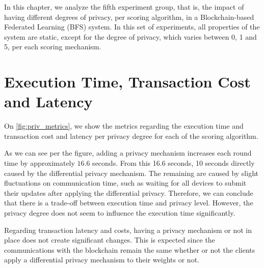 In this chapter, we analyze the fifth experiment group, that is, the impact of having different degrees of privacy, per scoring algorithm, in a Blockchain-based Federated Learning (BFS) system. In this set of experiments, all properties of the system are static, except for the degree of privacy, which varies between 0, 1 and 5, per each scoring mechanism.

\section{Execution Time, Transaction Cost and Latency}

On \autoref{fig:priv_metrics}, we show the metrics regarding the execution time and transaction cost and latency per privacy degree for each of the scoring algorithm.

As we can see per the figure, adding a privacy mechanism increases each round time by approximately $16.6$ seconds. From this 16.6 seconds, 10 seconds directly caused by the differential privacy mechanism. The remaining are caused by slight fluctuations on communication time, such as waiting for all devices to submit their updates after applying the differential privacy. Therefore, we can conclude that there is a trade-off between execution time and privacy level. However, the privacy degree does not seem to influence the execution time significantly.

Regarding transaction latency and costs, having a privacy mechanism or not in place does not create significant changes. This is expected since the communications with the blockchain remain the same whether or not the clients apply a differential privacy mechanism to their weights or not. 

